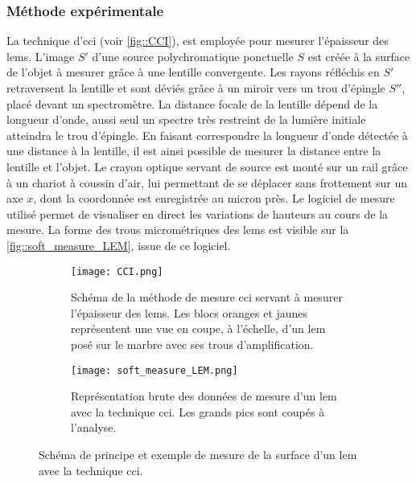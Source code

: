         \subsubsection{Méthode expérimentale}
          La technique d'\acrfull{cci} (voir \autoref{fig::CCI}), est employée pour mesurer l'épaisseur des \glspl{lem}. L'image $S'$ d'une source polychromatique ponctuelle $S$ est créée à la surface de l'objet à mesurer grâce à une lentille convergente. Les rayons réfléchis en $S'$ retraversent la lentille et sont déviés grâce à un miroir vers un trou d'épingle $S''$, placé devant un spectromètre. La distance focale de la lentille dépend de la longueur d'onde, aussi seul un spectre très restreint de la lumière initiale atteindra le trou d'épingle. En faisant correspondre la longueur d'onde détectée à une distance à la lentille, il est ainsi possible de mesurer la distance entre la lentille et l'objet. Le crayon optique servant de source est monté sur un rail grâce à un chariot à coussin d'air, lui permettant de se déplacer sans frottement sur un axe $x$, dont la coordonnée est enregistrée au micron près. Le logiciel de mesure utilisé permet de visualiser en direct les variations de hauteurs au cours de la mesure. La forme des trous micrométriques des \glspl{lem} est visible sur la \autoref{fig::soft_measure_LEM}, issue de ce logiciel. %
          
          \begin{figure}[htpb]
            \begin{subfigure}{0.48\textwidth}
              \texttt{[image: CCI.png]}
              \caption{\label{fig::CCI}Schéma de la méthode de mesure \gls{cci} servant à mesurer l'épaisseur des \glspl{lem}. Les blocs oranges et jaunes représentent une vue en coupe, à l'échelle, d'un \gls{lem} posé sur le marbre avec ses trous d'amplification.}
            \end{subfigure}
            \hfill
            \begin{subfigure}{0.48\textwidth}
              \texttt{[image: soft\_measure\_LEM.png]}
              \caption{\label{fig::soft_measure_LEM}Représentation brute des données de mesure d'un \gls{lem} avec la technique \gls{cci}. Les grands pics sont coupés à l'analyse.}
            \end{subfigure}
            \caption[Schéma de principe et exemple de mesure de la surface d'un LEM avec la technique CCI]{Schéma de principe et exemple de mesure de la surface d'un \gls{lem} avec la technique \gls{cci}.}
          \end{figure}
          
